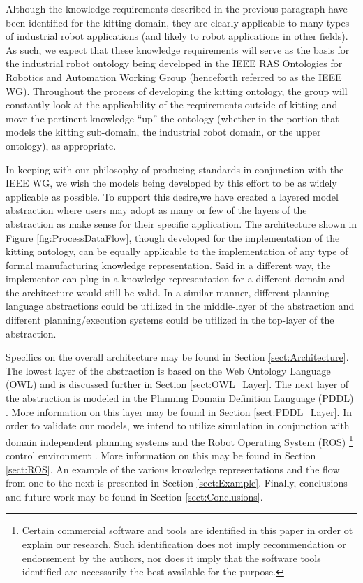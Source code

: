 \documentclass[a4paper, 10pt, conference]{ieeeconf}      %
\begin{document}
Although the knowledge requirements described in the previous paragraph have been identified for the kitting domain, they are clearly applicable to many types of industrial robot applications (and likely to robot applications in other fields). As such, we expect that these knowledge requirements will serve as the basis for the industrial robot ontology being developed in the IEEE  RAS Ontologies for Robotics and Automation Working Group \cite{Madhavan2011} (henceforth referred to as the IEEE WG). Throughout the process of developing the kitting ontology, the group will constantly look at the applicability of the requirements outside of kitting and move the pertinent knowledge ``up'' the ontology (whether in the portion that models the kitting sub-domain, the industrial robot domain, or the upper ontology), as appropriate.

In keeping with our philosophy of producing standards in conjunction with the IEEE WG, we wish the models being developed by this effort to be as widely applicable as possible. To support this desire,we have
created a layered model abstraction where users may adopt as many or few of the layers of the abstraction as make sense for their
specific application.  The architecture shown in Figure \ref{fig:ProcessDataFlow}, though developed for the implementation of the kitting ontology, can be equally applicable to the implementation of any type of formal manufacturing knowledge representation. Said in a different way, the implementor can plug in a knowledge representation for a different domain and the architecture would still be valid. In a similar manner, different planning language abstractions could be utilized in the middle-layer of the
abstraction and different planning/execution systems could be utilized in the top-layer of the abstraction.

Specifics on the overall architecture may be found in Section \ref{sect:Architecture}. The lowest layer of the abstraction
is based on
the Web Ontology Language (OWL) \cite{OWL} and is discussed further in Section \ref{sect:OWL_Layer}. The next layer of the
abstraction is
modeled in the Planning Domain Definition Language (PDDL) \cite{PDDL}. More information on this layer may be found in Section
\ref{sect:PDDL_Layer}. In order to validate our models, we intend to utilize simulation in conjunction with  domain independent planning
systems and the Robot
Operating System (ROS) \footnote{Certain commercial software and tools are identified in this paper in order ot explain our research. Such identification does not imply
recommendation or endorsement by the authors, nor does it imply that the software tools identified are necessarily the best available for the purpose.}
 control environment \cite{ROS}. More information on this may be found in Section \ref{sect:ROS}. An example of the
various knowledge representations and the flow from one to the next is presented in Section \ref{sect:Example}. Finally,
conclusions and future work may be found in Section \ref{sect:Conclusions}.
\end{document}
